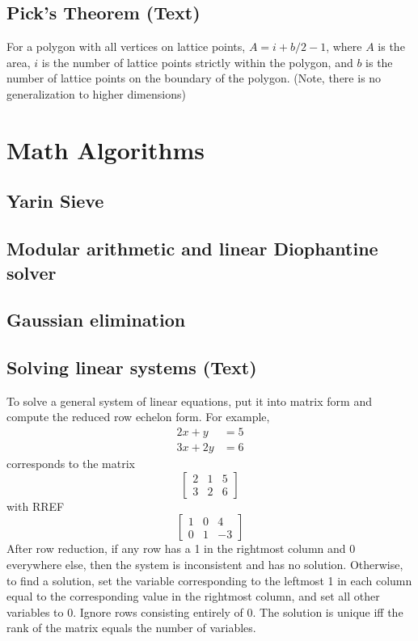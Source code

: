 \documentclass[12pt]{extarticle}
\begin{document}
\begin{multicols*}{2}
\subsection{Pick's Theorem (Text)} %
For a polygon with all vertices on lattice points, $A = i + b/2 - 1$, where $A$
is the area, $i$ is the number of lattice points strictly within the polygon,
and $b$ is the number of lattice points on the boundary of the polygon. (Note,
there is no generalization to higher dimensions)

\section{Math Algorithms}

\subsection{Yarin Sieve} %


\subsection{Modular arithmetic and linear Diophantine solver} %


\subsection{Gaussian elimination} %



\subsection{Solving linear systems (Text)} %
To solve a general system of linear equations, put it into matrix form and
compute the reduced row echelon form. For example,
\begin{align*}2x + y &= 5 \\ 3x + 2y &= 6\end{align*}
corresponds to the matrix
\[ \left[ \begin{array}{cc|c} 2 & 1 & 5 \\ 3 & 2 & 6 \end{array} \right] \]
with RREF
\[ \left[ \begin{array}{cc|c} 1 & 0 & 4 \\ 0 & 1 & -3 \end{array} \right] \]
After row reduction, if any row has a 1 in the rightmost column and 0
everywhere else, then the system is inconsistent and has no solution.
Otherwise, to find a solution, set the variable corresponding to the leftmost 1
in each column equal to the corresponding value in the rightmost column, and
set all other variables to 0. Ignore rows consisting entirely of 0. The
solution is unique iff the rank of the matrix equals the number of variables.


\end{multicols*}
\end{document}
